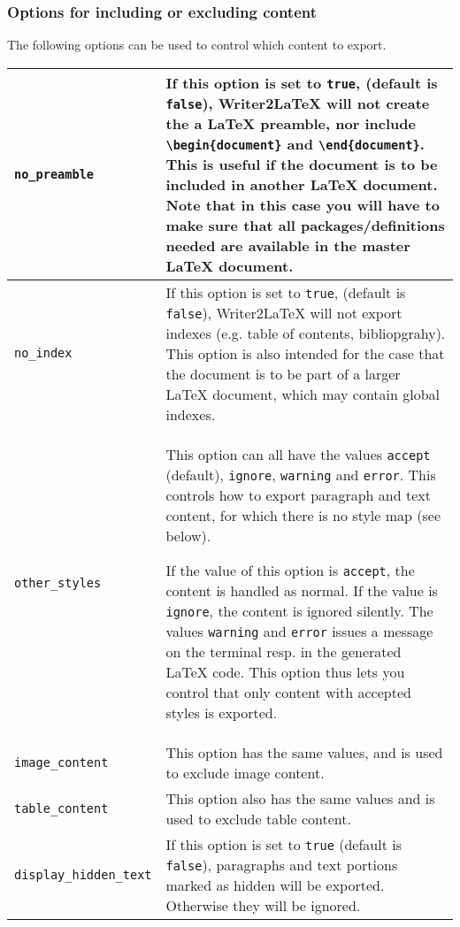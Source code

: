 \documentclass{article}
\newcommand\textstyleSourceText[1]{\texttt{\textmd{#1}}}
\begin{document}
\subsubsection{Options for including or excluding content}
{\mdseries
The following options can be used to control which content to export.}

\begin{center}
\begin{tabular}{|m{3.425cm}|m{13.188cm}|}

\hline
{\mdseries \textstyleSourceText{no\_preamble}} &
{\mdseries If this option is set to \textstyleSourceText{true}, (default is \textstyleSourceText{false}), Writer2LaTeX will not create the a LaTeX preamble, nor include \textstyleSourceText{{\textbackslash}begin\{document\}} and \textstyleSourceText{{\textbackslash}end\{document\}}. This is useful if the document is to be included in another LaTeX document. Note that in this case you will have to make sure that all packages/definitions needed are available in the master LaTeX document.}\\\hline
{\mdseries \textstyleSourceText{no\_index}} &
{\mdseries If this option is set to \textstyleSourceText{true}, (default is \textstyleSourceText{false}), Writer2LaTeX will not export indexes (e.g. table of contents, bibliopgrahy). This option is also intended for the case that the document is to be part of a larger LaTeX document, which may contain global indexes.}\\\hline
{\mdseries \textstyleSourceText{other\_styles}} &
{\mdseries This option can all have the values \textstyleSourceText{accept} (default), \textstyleSourceText{ignore}, \textstyleSourceText{warning} and \textstyleSourceText{error}. This controls how to export paragraph and text content, for which there is no style map (see below).}

{\mdseries If the value of this option is \textstyleSourceText{accept}, the content is handled as normal. If the value is \textstyleSourceText{ignore}, the content is ignored silently. The values \textstyleSourceText{warning} and \textstyleSourceText{error} issues a message on the terminal resp. in the generated LaTeX code. This option thus lets you control that only content with accepted styles is exported.}\\\hline
{\mdseries \textstyleSourceText{image\_content}} &
{\mdseries This option has the same values, and is used to exclude image content.}\\\hline
{\mdseries \textstyleSourceText{table\_content}} &
{\mdseries This option also has the same values and is used to exclude table content.}\\\hline
{\mdseries \textstyleSourceText{display\_hidden\_text}} &
{\mdseries If this option is set to \textstyleSourceText{true} (default is \textstyleSourceText{false}), paragraphs and text portions marked as hidden will be exported. Otherwise they will be ignored.}\\\hline
\end{tabular}
\end{center}
\end{document}
